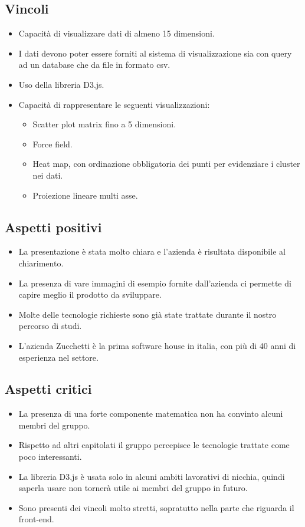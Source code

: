\subsection{Vincoli}
\begin{itemize}
\item Capacità di visualizzare dati di almeno 15 dimensioni.
\item I dati devono poter essere forniti al sistema di visualizzazione sia con query ad un database che da file in formato csv.
\item Uso della libreria D3.js.
\item Capacità di rappresentare le seguenti visualizzazioni:
\begin{itemize}
	\item Scatter plot matrix fino a 5 dimensioni.
	\item Force field.
	\item Heat map, con ordinazione obbligatoria dei punti per evidenziare i cluster nei dati.
	\item Proiezione lineare multi asse.
\end{itemize}
\end{itemize}

\subsection{Aspetti positivi}
\begin{itemize}
\item La presentazione è stata molto chiara e l’azienda è risultata disponibile al chiarimento.
\item La presenza di vare immagini di esempio fornite dall'azienda ci permette di capire meglio il prodotto da sviluppare.
\item Molte delle tecnologie richieste sono già state trattate durante il nostro percorso di studi.
\item L’azienda Zucchetti è la prima software house in italia, con più di 40 anni di esperienza nel settore.
\end{itemize}

\subsection{Aspetti critici}
\begin{itemize}
\item La presenza di una forte componente matematica non ha convinto alcuni membri del gruppo.
\item Rispetto ad altri capitolati il gruppo percepisce le tecnologie trattate come poco interessanti.
\item La libreria D3.js è usata solo in alcuni ambiti lavorativi di nicchia, quindi saperla usare non tornerà utile ai membri del gruppo in futuro.
\item Sono presenti dei vincoli molto stretti, sopratutto nella parte che riguarda il front-end.
\end{itemize}

